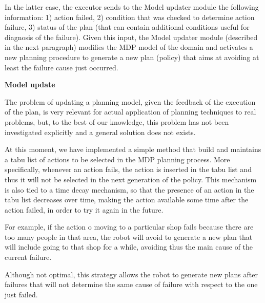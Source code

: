 In the latter case, the executor sends to the Model updater module the following information:
1) action failed, 2) condition that was checked to determine action failure, 3) status of the plan (that can contain additional conditions useful for diagnosis of the failure).
Given this input, the Model updater module (described in the next paragraph) modifies the MDP model of the domain and activates a new planning procedure to generate a new plan (policy) that aims at avoiding at least the failure cause just occurred.

\vspace{1em}

\noindent
{\bf Model update}

The problem of updating a planning model, given the feedback of the execution of the plan, is very relevant for actual application of planning techniques to real problems, but, to the best of our knowledge, this problem has not been investigated explicitly and a general solution does not exists.

At this moment, we have implemented a simple method that build and maintains a tabu list of actions to be selected in the MDP planning process.
More specifically, whenever an action fails, the action is inserted in the tabu list and thus it will not be selected in the next generation of the policy.
This mechanism is also tied to a time decay mechanism, so that the presence of an action in the tabu list decreases over time, making the action available some time after the action failed, in order to try it again in the future.

For example, if the action o moving to a particular shop fails because there are too many people in that area, the robot will avoid to generate a new plan that will include going to that shop for a while, avoiding thus the main cause of the current failure.

Although not optimal, this strategy allows the robot to generate new plans after failures that will not determine the same cause of failure with respect to the one just failed. 






